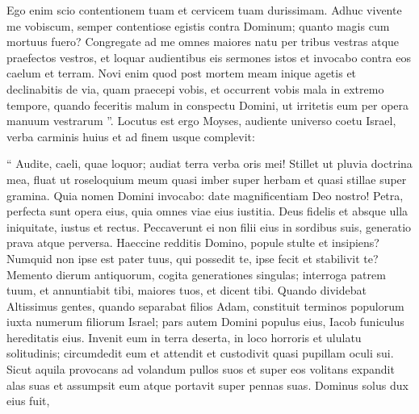 \begin{biblechapter}
\begin{biblechapter}
\begin{biblechapter}
\begin{biblechapter}
\begin{biblechapter}
\begin{biblechapter}
\begin{biblechapter}
\begin{biblechapter}
\begin{biblechapter}
\begin{biblechapter}
\begin{biblechapter}
\begin{biblechapter}
\begin{biblechapter}
\begin{biblechapter}
\begin{biblechapter}
\begin{biblechapter}
\begin{biblechapter}
\begin{biblechapter}
\begin{biblechapter}
\begin{biblechapter}
\begin{biblechapter}
\begin{biblechapter}
\begin{biblechapter}
\begin{biblechapter}
\begin{biblechapter}
\begin{biblechapter}
\begin{biblechapter}
\begin{biblechapter}
\begin{biblechapter}
\begin{biblechapter}
\begin{biblechapter}
\verse Ego enim scio contentionem tuam et cervicem tuam durissimam. Adhuc vivente me vobiscum, semper contentiose egistis contra Dominum; quanto magis cum mortuus fuero?
 \verse Congregate ad me omnes maiores natu per tribus vestras atque praefectos vestros, et loquar audientibus eis sermones istos et invocabo contra eos caelum et terram. 
\verse Novi enim quod post mortem meam inique agetis et declinabitis de via, quam praecepi vobis, et occurrent vobis mala in extremo tempore, quando feceritis malum in conspectu Domini, ut irritetis eum per opera manuum vestrarum ”. 
\verse Locutus est ergo Moyses, audiente universo coetu Israel, verba carminis huius et ad finem usque complevit:
 
\begin{biblechapter}
\verse “ Audite, caeli, quae loquor; audiat terra verba oris mei! 
\verse Stillet ut pluvia doctrina mea, fluat ut roseloquium meum
 quasi imber super herbam
 et quasi stillae super gramina.
 \verse Quia nomen Domini invocabo:
 date magnificentiam Deo nostro!
 \verse Petra, perfecta sunt opera eius,
 quia omnes viae eius iustitia.
 Deus fidelis et absque ulla iniquitate,
 iustus et rectus.
 \verse Peccaverunt ei non filii eius in sordibus suis,
 generatio prava atque perversa.
 \verse Haeccine redditis Domino,
 popule stulte et insipiens?
 Numquid non ipse est pater tuus, qui possedit te,
 ipse fecit et stabilivit te?
 \verse Memento dierum antiquorum,
 cogita generationes singulas;
 interroga patrem tuum, et annuntiabit tibi,
 maiores tuos, et dicent tibi.
 \verse Quando dividebat Altissimus gentes,
 quando separabat filios Adam,
 constituit terminos populorum
 iuxta numerum filiorum Israel;
 \verse pars autem Domini populus eius,
 Iacob funiculus hereditatis eius.
 \verse Invenit eum in terra deserta,
 in loco horroris et ululatu solitudinis;
 circumdedit eum et attendit
 et custodivit quasi pupillam oculi sui.
 \verse Sicut aquila provocans ad volandum pullos suos
 et super eos volitans expandit alas suas
 et assumpsit eum
 atque portavit super pennas suas.
 \verse Dominus solus dux eius fuit,

\end{biblechapter}
\end{biblechapter}
\end{biblechapter}
\end{biblechapter}
\end{biblechapter}
\end{biblechapter}
\end{biblechapter}
\end{biblechapter}
\end{biblechapter}
\end{biblechapter}
\end{biblechapter}
\end{biblechapter}
\end{biblechapter}
\end{biblechapter}
\end{biblechapter}
\end{biblechapter}
\end{biblechapter}
\end{biblechapter}
\end{biblechapter}
\end{biblechapter}
\end{biblechapter}
\end{biblechapter}
\end{biblechapter}
\end{biblechapter}
\end{biblechapter}
\end{biblechapter}
\end{biblechapter}
\end{biblechapter}
\end{biblechapter}
\end{biblechapter}
\end{biblechapter}
\end{biblechapter}
